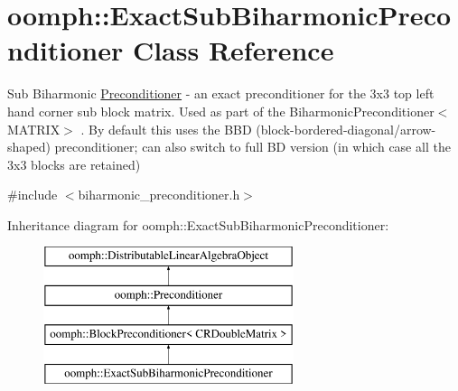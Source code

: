 \hypertarget{classoomph_1_1ExactSubBiharmonicPreconditioner}{}\section{oomph\+:\+:Exact\+Sub\+Biharmonic\+Preconditioner Class Reference}
\label{classoomph_1_1ExactSubBiharmonicPreconditioner}


Sub Biharmonic \hyperlink{classoomph_1_1Preconditioner}{Preconditioner} -\/ an exact preconditioner for the 3x3 top left hand corner sub block matrix. Used as part of the Biharmonic\+Preconditioner$<$\+M\+A\+T\+R\+I\+X$>$ . By default this uses the B\+BD (block-\/bordered-\/diagonal/arrow-\/shaped) preconditioner; can also switch to full BD version (in which case all the 3x3 blocks are retained)  




{\ttfamily \#include $<$biharmonic\+\_\+preconditioner.\+h$>$}

Inheritance diagram for oomph\+:\+:Exact\+Sub\+Biharmonic\+Preconditioner\+:\begin{figure}[H]
\begin{center}
\leavevmode
\includegraphics[height=4.000000cm]{classoomph_1_1ExactSubBiharmonicPreconditioner}
\end{center}
\end{figure}
